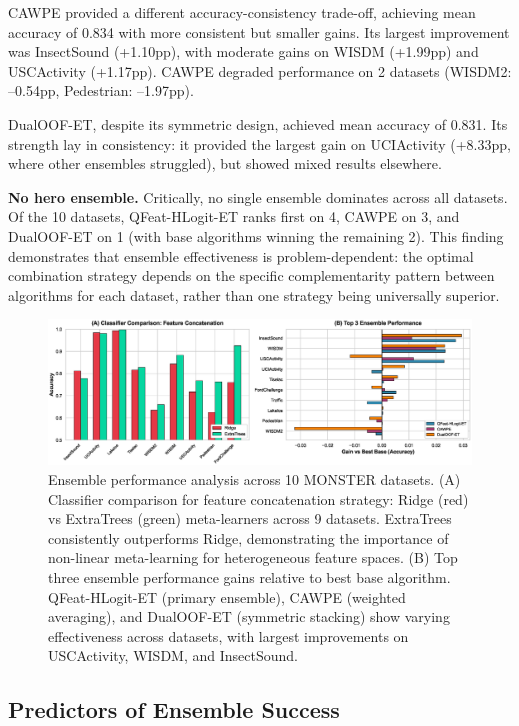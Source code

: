 \documentclass[pdflatex,sn-basic]{sn-jnl}           %
\theoremstyle{thmstyleone}%
\theoremstyle{thmstyletwo}%
\theoremstyle{thmstylethree}%
\begin{document}
CAWPE provided a different accuracy-consistency trade-off, achieving mean accuracy of 0.834 with more consistent but smaller gains. Its largest improvement was InsectSound (+1.10pp), with moderate gains on WISDM (+1.99pp) and USCActivity (+1.17pp). CAWPE degraded performance on 2 datasets (WISDM2: --0.54pp, Pedestrian: --1.97pp).

DualOOF-ET, despite its symmetric design, achieved mean accuracy of 0.831. Its strength lay in consistency: it provided the largest gain on UCIActivity (+8.33pp, where other ensembles struggled), but showed mixed results elsewhere.

\textbf{No hero ensemble.} Critically, no single ensemble dominates across all datasets. Of the 10 datasets, QFeat-HLogit-ET ranks first on 4, CAWPE on 3, and DualOOF-ET on 1 (with base algorithms winning the remaining 2). This finding demonstrates that ensemble effectiveness is problem-dependent: the optimal combination strategy depends on the specific complementarity pattern between algorithms for each dataset, rather than one strategy being universally superior.

\begin{figure}[t]
\centering
\includegraphics[width=\textwidth]{figure2_ensemble_performance}
\caption{Ensemble performance analysis across 10 MONSTER datasets. (A) Classifier comparison for feature concatenation strategy: Ridge (red) vs ExtraTrees (green) meta-learners across 9 datasets. ExtraTrees consistently outperforms Ridge, demonstrating the importance of non-linear meta-learning for heterogeneous feature spaces. (B) Top three ensemble performance gains relative to best base algorithm. QFeat-HLogit-ET (primary ensemble), CAWPE (weighted averaging), and DualOOF-ET (symmetric stacking) show varying effectiveness across datasets, with largest improvements on USCActivity, WISDM, and InsectSound.}\label{fig:ensemble}
\end{figure}

\subsection{Predictors of Ensemble Success}\label{subsec:predictors}
\end{document}
